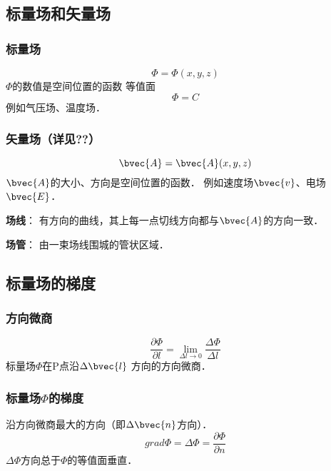 
\subsection{标量场和矢量场}
\subsubsection{标量场}
\begin{equation}\label{VecAnl_eq1}
\Phi=\Phi(x,y,z)
\end{equation}
 $\Phi$的数值是空间位置的函数
 等值面
\begin{equation}\label{VecAnl_eq2}
\Phi=C
\end{equation}
 例如气压场、温度场．
\subsubsection{矢量场（详见??）}%
\begin{equation}\label{VecAnl_eq3}
\bvec {A}= \bvec{A}(x,y,z)
\end{equation}
$\bvec{A}$的大小、方向是空间位置的函数．
例如速度场$\bvec{v}$、电场$\bvec{E}$．

\textbf{场线}： 有方向的曲线，其上每一点切线方向都与$\bvec{A}$的方向一致．

\textbf{场管}： 由一束场线围城的管状区域．

\subsection{标量场的梯度}%
\subsubsection{方向微商}
\begin{equation}\label{VecAnl_eq4}
\frac{\partial \Phi}{\partial l}=\lim_{\Delta l \to 0}\frac{\Delta \Phi}{\Delta l}
\end{equation}
标量场$\Phi$在P点沿$\Delta \bvec{l} $ 方向的方向微商．

\subsubsection{标量场$\Phi$的梯度}
沿方向微商最大的方向（即$\Delta \bvec{n}$方向）．
\begin{equation}\label{VecAnl_eq5}
grad \Phi = \Delta \Phi =\frac{\partial \Phi}{\partial n}
\end{equation}
$\Delta \Phi$方向总于$\Phi$的等值面垂直．


